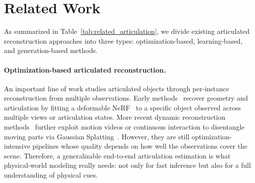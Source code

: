 \section{Related Work}%

As summarized in Table~\ref{tab:related_articulation}, we divide existing articulated reconstruction approaches into three types: optimization-based, learning-based, and generation-based methods.

\paragraph{Optimization-based articulated reconstruction.} 
An important line of work studies articulated objects through per-instance reconstruction from multiple observations. Early methods~\cite{liu2023paris,tseng2022cla,wei2022self} recover geometry and articulation by fitting a deformable NeRF~\cite{mildenhall2020nerf} to a specific object observed across multiple views or articulation states. More recent dynamic reconstruction methods~\cite{liu2025artgs,wu2025reartgs,ai2026aim,shen2025gaussianart,liu2025videoartgs,guo2026articulat3d} further exploit motion videos or continuous interaction to disentangle moving parts via Gaussian Splatting~\cite{kerbl20233d}. However, they are still optimization-intensive pipelines whose quality depends on how well the observations cover the scene.
Therefore, a generalizable end-to-end articulation estimation is what physical-world modeling really needs: not only for fast inference but also for a full understanding of physical cues.

